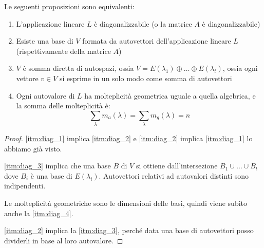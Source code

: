 \begin{prop}
Le seguenti proposizioni sono equivalenti:
\begin{enumerate}
    \item\label{itm:diag_1} L'applicazione lineare $L$ \`e diagonalizzabile (o la matrice $A$ \`e diagonalizzabile)
    \item\label{itm:diag_2} Esiste una base di $V$ formata da autovettori dell'applicazione lineare $L$ (rispettivamente della matrice $A$)
    \item\label{itm:diag_3} $V$ \`e somma diretta di autospazi, ossia $V = E(\lambda_1) \oplus \ldots \oplus E(\lambda_t)$, ossia ogni vettore $v \in V$ si esprime in un solo modo come somma di autovettori
    \item\label{itm:diag_4} Ogni autovalore di $L$ ha molteplicit\`a geometrica uguale a quella algebrica, e la somma delle molteplicit\`a \`e:
    \[
    \sum_{\lambda} m_a(\lambda) = \sum_{\lambda} m_g(\lambda) = n
    \]
\end{enumerate}
\end{prop}
\begin{proof}
\ref{itm:diag_1} implica \ref{itm:diag_2} e \ref{itm:diag_2} implica \ref{itm:diag_1} lo abbiamo gi\`a visto.

\ref{itm:diag_3} implica che una base $B$ di $V$ si ottiene dall'intersezione $B_1 \cup \ldots \cup B_t$ dove $B_i$ \`e una base di $E(\lambda_i)$. Autovettori relativi ad autovalori distinti sono indipendenti.

Le molteplicit\`a geometriche sono le dimensioni delle basi, quindi viene subito anche la \ref{itm:diag_4}.

\ref{itm:diag_2} implica la \ref{itm:diag_3}, perch\'e data una base di autovettori posso dividerli in base al loro autovalore.

\end{proof}

